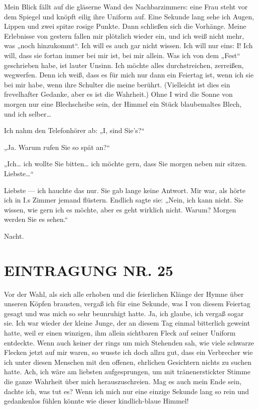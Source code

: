 Mein Blick fällt auf die gläserne Wand
des Nachbarzimmers: eine Frau steht vor dem Spiegel und knöpft
eilig ihre Uniform auf. Eine Sekunde lang sehe ich Augen, Lippen
und zwei spitze rosige Punkte. Dann schließen sich die Vorhänge.
Meine Erlebnisse von gestern fallen mir plötzlich wieder ein, und
ich weiß nicht mehr, was „noch hinzukommt“. Ich will es auch gar
nicht wissen. Ich will nur eins: I! Ich will, dass sie fortan immer
bei mir ist, bei mir allein. Was ich von dem „Fest“ geschrieben
habe, ist lauter Unsinn. Ich möchte alles durchstreichen,
zerreißen, wegwerfen. Denn ich weiß, dass es für mich nur dann ein
Feiertag ist, wenn ich sie bei mir habe, wenn ihre Schulter die
meine berührt. (Vielleicht ist dies ein frevelhafter Gedanke, aber
es ist die Wahrheit.) Ohne I wird die Sonne von morgen nur eine
Blechscheibe sein, der Himmel ein Stück blaubemaltes Blech, und ich
selber\ldots{}

Ich nahm den Telefonhörer ab: „I, sind Sie's?“

„Ja. Warum rufen Sie so spät an?“

„Ich\ldots{} ich wollte Sie bitten\ldots{} ich möchte gern, dass Sie morgen
neben mir sitzen. Liebste\ldots{}“

Liebste — ich hauchte das nur. Sie
gab lange keine Antwort. Mir war, als hörte ich in I.s Zimmer
jemand flüstern. Endlich sagte sie: „Nein, ich kann nicht. Sie
wissen, wie gern ich es möchte, aber es geht wirklich nicht. Warum?
Morgen werden Sie es sehen.“

Nacht.

\section{EINTRAGUNG NR. 25}

Vor der Wahl, als sich alle erhoben und die feierlichen Klänge der
Hymne über unseren Köpfen brausten, vergaß ich für eine Sekunde,
was I von diesem Feiertag gesagt und was mich so sehr beunruhigt
hatte. Ja, ich glaube, ich vergaß sogar sie. Ich war wieder der
kleine Junge, der an diesem Tag einmal bitterlich geweint hatte,
weil er einen winzigen, ihm allein sichtbaren Fleck auf seiner
Uniform entdeckte. Wenn auch keiner der rings um mich Stehenden
sah, wie viele schwarze Flecken jetzt auf mir waren, so wusste ich
doch allzu gut, dass ein Verbrecher wie ich unter diesen Menschen
mit den offenen, ehrlichen Gesichtern nichts zu suchen hatte. Ach,
ich wäre am liebsten aufgesprungen, um mit tränenerstickter Stimme
die ganze Wahrheit über mich herauszuschreien. Mag es auch mein Ende
sein, dachte ich, was tut es? Wenn ich mich nur eine einzige
Sekunde lang so rein und gedankenlos fühlen könnte wie dieser
kindlich-blaue Himmel!

